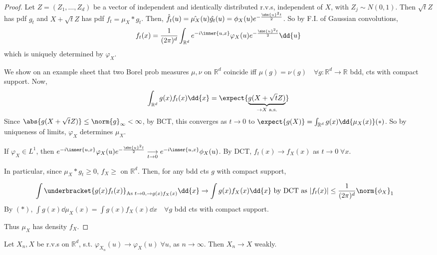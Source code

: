 \begin{proof}
	Let $Z = (Z_1, \dots, Z_d)$ be a vector of independent and identically distributed r.v.s, independent of $X$, with $Z_j \sim N(0,1)$.
	Then $\sqrt{t} Z$ has pdf $g_t$ and $X + \sqrt{t} Z$ has pdf $f_t = \mu_X \ast g_t$.
	Then, $\hat{f_t}(u) = \hat{\mu_X}(u) \hat{g_t}(u) = \phi_X(u) e^{-\frac{\abs{u}^2 t}{2}}$.
	So by F.I. of Gaussian convolutions,
	\[ f_t(x) = \frac{1}{(2\pi)^d} \int_{\mathbb R^d} e^{-i\inner{u,x}} \varphi_X(u) e^{-\frac{\abs{u}^2 t}{2}} \dd{u} \]
	which is uniquely determined by $\varphi_X$.

	We show on an example sheet that two Borel prob measures $\mu, \nu$ on $\mathbb R^d$ coincide iff $\mu(g) = \nu(g) \quad \forall g \colon \mathbb R^d \to \mathbb R$ bdd, cts with compact support.
	Now,
	\[ \int_{\mathbb R^d} g(x) f_t(x) \dd{x} = \expect{\underbrace{g(X + \sqrt{t} Z)}_{\to X \text{ a.s.}}} \]
	Since $\abs{g(X + \sqrt{t}Z)} \leq \norm{g}_\infty < \infty$, by BCT, this converges as $t \to 0$ to $\expect{g(X)} = \int_{\mathbb R^d} g(x) \dd{\mu_X(x)} (\ast)$.
	So by uniqueness of limits, $\varphi_X$ determines $\mu_X$.

	If $\varphi_X \in L^1$, then $ e^{-i\inner{u,x}} \varphi_X(u) e^{-\frac{\abs{u}^2 t}{2}} \underset{t \to 0}{\longrightarrow} e^{-i\inner{u,x}} \phi_X(u)$.
	By DCT, $f_t(x) \to f_X(x)$ as $t \to 0 \; \forall x$.

	In particular, since $\mu_X \ast g_t \geq 0$, $f_X \geq$ on $\mathbb R^d$.
	Then, for any bdd cts $g$ with compact support,

	\begin{align*}
		\int \underbracket{g(x) f_t(x)}_{\text{As } t \to 0, \to g(x) f_X(x)} \dd{x} &\to \int g(x) f_X(x) \dd{x} \text{ by DCT as } |f_t(x)| \leq \frac{1}{(2\pi)^d} \norm{\phi_X}_1
	\end{align*}
	By $(\ast)$, $\int g(x) \dd{\mu_X(x)} = \int g(x) f_X(x) \dd{x} \quad \forall g$ bdd cts with compact support.

	Thus $\mu_X$ has density $f_X$.
\end{proof}

\begin{theorem}
	Let $X_n, X$ be r.v.s on $\mathbb R^d$, s.t. $\varphi_{X_n}(u) \to \varphi_X(u) \; \forall u$, as $n \to \infty$.
	Then $X_n \to X$ weakly.
\end{theorem}

